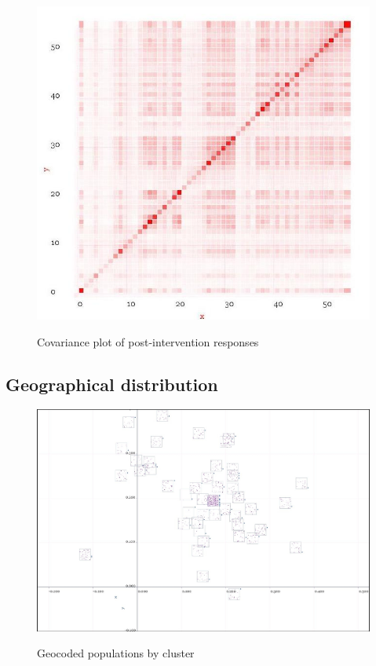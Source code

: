 \documentclass[10pt]{article}
\begin{document}
\begin{figure}
\caption{Covariance plot of post-intervention responses}
\label{CovariancePost}
\begin{center}
\includegraphics[width=120mm]{ReportMedia/CovariancePost.jpg}\\
\end{center}
\end{figure}
\newpage
\subsection{Geographical distribution}
\begin{figure}
\caption{Geocoded populations by cluster}
\label{GeographicalDistributionOfPopulation}
\begin{center}
\includegraphics[width=170mm]{ReportMedia/GeographicalDistributionOfPopulation.jpg}\\
\end{center}
\end{figure}
\newpage
\end{document}

